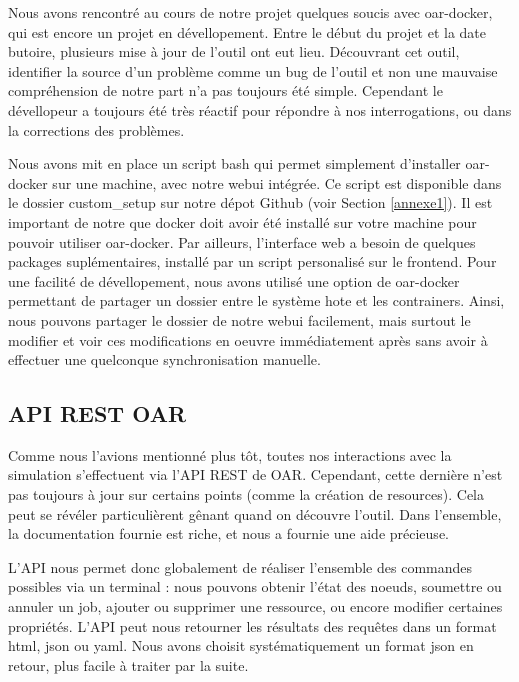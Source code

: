 \documentclass[a4paper,10pt]{article}
\begin{document}
Nous avons rencontré au cours de notre projet quelques soucis avec oar-docker, qui est encore un projet en dévellopement. Entre le début du projet et la date butoire, plusieurs
mise à jour de l'outil ont eut lieu. Découvrant cet outil, identifier la source d'un problème comme un bug de l'outil et non une mauvaise compréhension de notre part n'a pas toujours été simple.
Cependant le dévellopeur a toujours été très réactif pour répondre à nos interrogations, ou dans la corrections des problèmes.

\vspace{0.5cm}

Nous avons mit en place un script bash qui permet simplement d'installer oar-docker sur une machine, avec notre webui intégrée. Ce script est disponible dans le dossier custom\_setup
sur notre dépot Github (voir Section \ref{annexe1}). Il est important de notre que docker doit avoir été installé sur votre machine pour pouvoir utiliser oar-docker. Par ailleurs, l'interface web a besoin de quelques packages
suplémentaires, installé par un script personalisé sur le frontend. Pour une facilité de dévellopement,
nous avons utilisé une option de oar-docker permettant de partager un dossier entre le système hote et les contrainers. Ainsi, nous pouvons partager le dossier de notre webui facilement, mais surtout le modifier
et voir ces modifications en oeuvre immédiatement après sans avoir à effectuer une quelconque synchronisation manuelle.
\newpage
\subsection{API REST OAR}
Comme nous l'avions mentionné plus tôt, toutes nos interactions avec la simulation s'effectuent via l'API REST de OAR.
Cependant, cette dernière n'est pas toujours à jour sur certains points (comme la création de resources).
Cela peut se révéler particulièrent gênant quand on découvre l'outil. Dans l'ensemble, la documentation fournie est riche,
et nous a fournie une aide précieuse.
\vspace{0.5cm}

L'API nous permet donc globalement de réaliser l'ensemble des commandes possibles via un terminal : nous pouvons obtenir l'état des noeuds, soumettre ou annuler un job, ajouter ou supprimer une ressource,
ou encore modifier certaines propriétés. L'API peut nous retourner les résultats des requêtes dans un format html, json ou yaml. Nous avons choisit systématiquement un format json en retour, plus facile à traiter par la suite.
\vspace{0.5cm}
\end{document}
